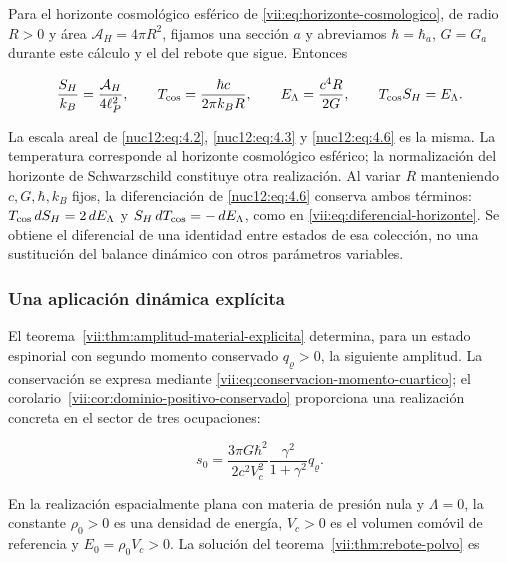 Para el horizonte cosmológico esférico de \eqref{vii:eq:horizonte-cosmologico}, de radio \(R>0\) y área \(\mathcal A_H=4\pi R^2\), fijamos una sección \(a\) y abreviamos \(\hbar=\hbar_a\), \(G=G_a\) durante este cálculo y el del rebote que sigue. Entonces



\begin{equation}
\frac{S_H}{k_B}=\frac{\mathcal A_H}{4\ell_P^2},\qquad
T_{\rm cos}=\frac{\hbar c}{2\pi k_BR},\qquad
E_\Lambda=\frac{c^4R}{2G},\qquad T_{\rm cos}S_H=E_\Lambda .
\label{nuc12:eq:4.6}
\end{equation}



La escala areal de \eqref{nuc12:eq:4.2}, \eqref{nuc12:eq:4.3} y \eqref{nuc12:eq:4.6} es la misma. La temperatura corresponde al horizonte cosmológico esférico; la normalización del horizonte de Schwarzschild constituye otra realización. Al variar \(R\) manteniendo \(c,G,\hbar,k_B\) fijos, la diferenciación de \eqref{nuc12:eq:4.6} conserva ambos términos: \(T_{\rm cos}\,dS_H=2\,dE_\Lambda\) y \(S_H\,dT_{\rm cos}=-\,dE_\Lambda\), como en \eqref{vii:eq:diferencial-horizonte}. Se obtiene el diferencial de una identidad entre estados de esa colección, no una sustitución del balance dinámico con otros parámetros variables.

\subsubsection{Una aplicación dinámica explícita}

El teorema~\ref{vii:thm:amplitud-material-explicita} determina, para un estado espinorial con segundo momento conservado \(q_\varrho>0\), la siguiente amplitud. La conservación se expresa mediante \eqref{vii:eq:conservacion-momento-cuartico}; el corolario~\ref{vii:cor:dominio-positivo-conservado} proporciona una realización concreta en el sector de tres ocupaciones:



\begin{equation}
s_0=\frac{3\pi G\hbar^2}{2c^2V_c^2}
\frac{\gamma^2}{1+\gamma^2}q_\varrho .
\label{nuc12:eq:4.7}
\end{equation}



En la realización espacialmente plana con materia de presión nula y \(\Lambda=0\), la constante \(\rho_0>0\) es una densidad de energía, \(V_c>0\) es el volumen comóvil de referencia y \(E_0=\rho_0V_c>0\). La solución del teorema~\ref{vii:thm:rebote-polvo} es



